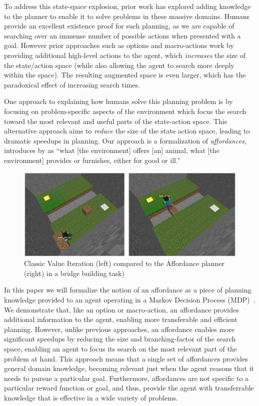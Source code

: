 \documentclass[]{article}
\begin{document}
To address this state-space explosion, prior work has explored adding
knowledge to the planner to enable it to solve problems in these
massive domains. Humans provide an excellent existence proof for such
planning, as we are capable of searching over an immense number of
possible actions when presented with a goal.  However prior approaches
such as options and macro-actions work by providing additional
high-level actions to the agent, which {\em increases} the size of the
state/action space (while also allowing the agent to search more
deeply within the space).  The resulting augmented space is even
larger, which has the paradoxical effect of increasing search times.


One approach to explaining how humans solve this planning problem is
by focusing on problem-specific aspects of the environment which focus
the search toward the most relevant and useful parts of the
state-action space.  This alternative approach aims to {\em reduce}
the size of the state action space, leading to dramatic speedups in
planning.  Our approach is a formalization of {\em affordances},
introduces by \citet{gibson77} as ``what [the environment] offers [an]
animal, what [the environment] provides or furnishes, either for good
or ill.''  


\begin{figure}
\centering
\includegraphics[scale =
  0.21]{figures/bridgeworld_vi_vs_aff.png}
  \caption{Classic Value Iteration (left) compared to the Affordance planner (right) in a bridge building task)}
\end{figure}

In this paper we will formalize the notion of an affordance as a piece
of planning knowledge provided to an agent operating in a Markov
Decision Process (MDP)~\citep{kaelbling99}.  We demonstrate that, like
an option or macro-action, an affordance provides additional
information to the agent, enabling more transferable and efficient
planning.  However, unlike previous approaches, an affordance enables
more significant speedups by reducing the size and branching-factor of
the search space, enabling an agent to focus its search on the most
relevant part of the problem at hand.  This approach means that a
single set of affordances provides general domain knowledge, becoming
relevant just when the agent reasons that it needs to pursue a
particular goal.  Furthermore, affordances are not specific to a
particular reward function or goal, and thus, provide the agent with
transferrable knowledge that is effective in a wide variety of
problems.
\end{document}
